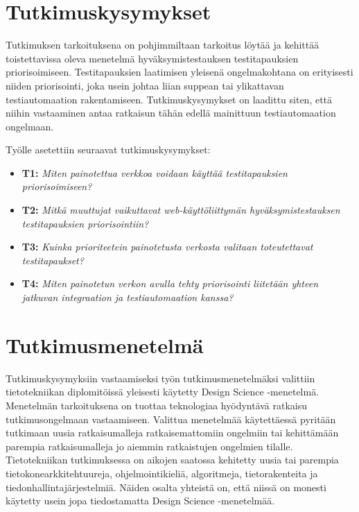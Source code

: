 \section{Tutkimuskysymykset} \label{ch:06_tutkimuskysymykset}

  Tutkimuksen tarkoituksena on pohjimmiltaan tarkoitus löytää ja kehittää toistettavissa oleva menetelmä hyväksymistestauksen testitapauksien priorisoimiseen.
  Testitapauksien laatimisen yleisenä ongelmakohtana on erityisesti niiden priorisointi, joka usein johtaa liian suppean tai ylikattavan testiautomaation rakentamiseen.
  Tutkimuskysymykset on laadittu siten, että niihin vastaaminen antaa ratkaisun tähän edellä mainittuun testiautomaation ongelmaan.

  Työlle asetettiin seuraavat tutkimuskysymykset:

  \begin{itemize}
    \item \textbf{T1:} \emph{Miten painotettua verkkoa voidaan käyttää testitapauksien priorisoimiseen?}
    \item \textbf{T2:} \emph{Mitkä muuttujat vaikuttavat web-käyttöliittymän hyväksymistestauksen testitapauksien priorisointiin?}
    \item \textbf{T3:} \emph{Kuinka prioriteetein painotetusta verkosta valitaan toteutettavat testitapaukset?}
    \item \textbf{T4:} \emph{Miten painotetun verkon avulla tehty priorisointi liitetään yhteen jatkuvan integraation ja testiautomaation kanssa?}
  \end{itemize}

  \section{Tutkimusmenetelmä} \label{ch:06_tutkimusmenetelma}

  Tutkimuskysymyksiin vastaamiseksi työn tutkimusmenetelmäksi valittiin tietotekniikan diplomitöissä yleisesti käytetty Design Science -menetelmä.
  Menetelmän tarkoituksena on tuottaa teknologiaa hyödyntävä ratkaisu tutkimusongelmaan vastaamiseen.
  Valittua menetelmää käytettäessä pyritään tutkimaan uusia ratkaisumalleja ratkaisemattomiin ongelmiin tai kehittämään parempia ratkaisumalleja jo aiemmin ratkaistujen ongelmien tilalle.
  Tietotekniikan tutkimuksessa on aikojen saatossa kehitetty uusia tai parempia tietokonearkkitehtuureja, ohjelmointikieliä, algoritmeja, tietorakenteita ja tiedonhallintajärjestelmiä.
  Näiden osalta yhteistä on, että niissä on monesti käytetty usein jopa tiedostamatta Design Science -menetelmää. %


